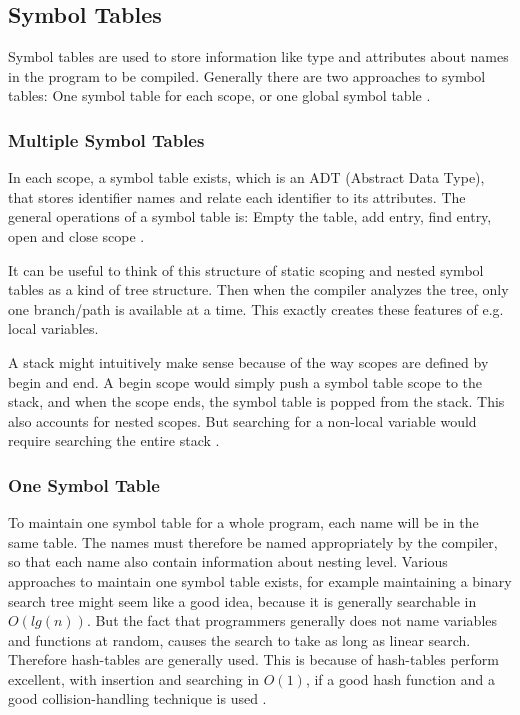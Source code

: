 \subsection{Symbol Tables}
Symbol tables are used to store information like type and attributes about names in the program to be compiled. Generally there are two approaches to symbol tables: One symbol table for each scope, or one global symbol table \citep{sebesta}. 
\subsubsection*{Multiple Symbol Tables}
In each scope, a symbol table exists, which is an ADT (Abstract Data Type), that stores identifier names and relate each identifier to its attributes. The general operations of a symbol table is: Empty the table, add entry, find entry, open and close scope \citep{sebesta}. 

It can be useful to think of this structure of static scoping and nested symbol tables as a kind of tree structure. Then when the compiler analyzes the tree, only one branch/path is available at a time. This exactly creates these features of e.g. local variables.

A stack might intuitively make sense because of the way scopes are defined by begin and end. A begin scope would simply push a symbol table scope to the stack, and when the scope ends, the symbol table is popped from the stack. This also accounts for nested scopes. But searching for a non-local variable would require searching the entire stack \citep{sebesta}. 

\subsubsection*{One Symbol Table}
To maintain one symbol table for a whole program, each name will be in the same table. The names must therefore be named appropriately by the compiler, so that each name also contain information about nesting level. Various approaches to maintain one symbol table exists, for example maintaining a binary search tree might seem like a good idea, because it is generally searchable in $O(lg(n))$. But the fact that programmers generally does not name variables and functions at random, causes the search to take as long as linear search. Therefore hash-tables are generally used. This is because of hash-tables perform excellent, with insertion and searching in $O(1)$, if a good hash function and a good collision-handling technique is used \citep{sebesta}.